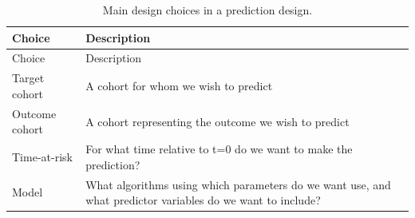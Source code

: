 \documentclass[]{book}
\begin{document}
\begin{longtable}[]{@{}ll@{}}
\caption{\label{tab:plpDesign} Main design choices in a prediction
design.}\tabularnewline
\toprule
\begin{minipage}[b]{0.23\columnwidth}\raggedright\strut
Choice\strut
\end{minipage} & \begin{minipage}[b]{0.71\columnwidth}\raggedright\strut
Description\strut
\end{minipage}\tabularnewline
\midrule
\endfirsthead
\toprule
\begin{minipage}[b]{0.23\columnwidth}\raggedright\strut
Choice\strut
\end{minipage} & \begin{minipage}[b]{0.71\columnwidth}\raggedright\strut
Description\strut
\end{minipage}\tabularnewline
\midrule
\endhead
\begin{minipage}[t]{0.23\columnwidth}\raggedright\strut
Target cohort\strut
\end{minipage} & \begin{minipage}[t]{0.71\columnwidth}\raggedright\strut
A cohort for whom we wish to predict\strut
\end{minipage}\tabularnewline
\begin{minipage}[t]{0.23\columnwidth}\raggedright\strut
Outcome cohort\strut
\end{minipage} & \begin{minipage}[t]{0.71\columnwidth}\raggedright\strut
A cohort representing the outcome we wish to predict\strut
\end{minipage}\tabularnewline
\begin{minipage}[t]{0.23\columnwidth}\raggedright\strut
Time-at-risk\strut
\end{minipage} & \begin{minipage}[t]{0.71\columnwidth}\raggedright\strut
For what time relative to t=0 do we want to make the prediction?\strut
\end{minipage}\tabularnewline
\begin{minipage}[t]{0.23\columnwidth}\raggedright\strut
Model\strut
\end{minipage} & \begin{minipage}[t]{0.71\columnwidth}\raggedright\strut
What algorithms using which parameters do we want use, and what
predictor variables do we want to include?\strut
\end{minipage}\tabularnewline
\bottomrule
\end{longtable}
\end{document}
